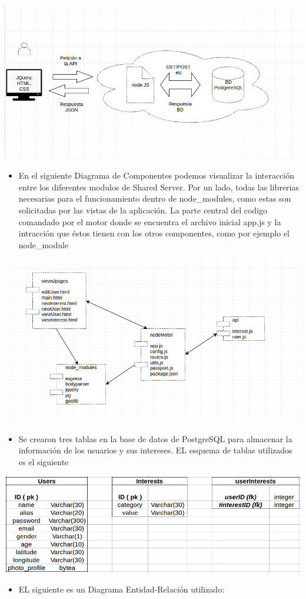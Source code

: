 \documentclass[letterpaper,10pt,english]{sphinxmanual}
\begin{document}
\includegraphics{esquemaShared.png}
\begin{itemize}
\item {} 
En el siguiente Diagrama de Componentes podemos visualizar la interacción entre los diferentes modulos de Shared Server. Por un lado, todas las librerias necesarias para el funcionamiento dentro de node\_modules, como estas son solicitadas por las vistas de la aplicación. La parte central del codigo comandado por el motor donde se encuentra el archivo inicial app.js y la intracción que éstos tienen con los otros componentes, como por ejemplo el node\_module

\end{itemize}

\includegraphics{componentesShared.png}
\begin{itemize}
\item {} 
Se crearon tres tablas en la base de datos de PostgreSQL para almacenar la información de los usuarios y sus intereses. EL esquema de tablas utilizados es el siguiente

\end{itemize}

\includegraphics{tablasShared.png}
\begin{itemize}
\item {} 
EL siguiente es un Diagrama Entidad-Relación utilizado:

\end{itemize}
\end{document}
